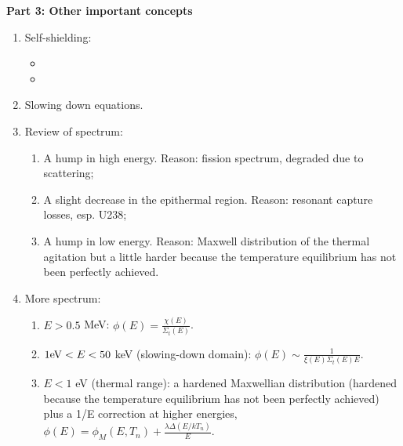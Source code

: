 \documentclass{school-22.211-notes}
\begin{document}
\textbf{Part 3: Other important concepts}
\begin{enumerate}
\item Self-shielding: 
  \begin{itemize}
    \item 
    \item 
  \end{itemize}
\item Slowing down equations. 
\item Review of spectrum:
    \begin{enumerate}
      \item A hump in high energy. Reason: fission spectrum, degraded due to scattering; 
      \item A slight decrease in the epithermal region. Reason: resonant capture losses, esp. U238; 
      \item A hump in low energy. Reason: Maxwell distribution of the thermal agitation but a little harder because the temperature equilibrium has not been perfectly achieved. 
    \end{enumerate}
\item More spectrum: 
  \begin{enumerate}
  \item $E > 0.5$ MeV: $\phi(E) = \frac{\chi(E)}{\Sigma_t(E)}$.
  \item $1 \mathrm{eV} < E < 50$ keV (slowing-down domain): $\phi(E) \sim \frac{1}{\xi(E) \Sigma_t(E) E}$. 
  \item $E < 1$ eV (thermal range): a hardened Maxwellian distribution (hardened because the temperature equilibrium has not been perfectly achieved) plus a 1/E correction at higher energies, $\phi(E) = \phi_M (E, T_n) + \frac{ \lambda \Delta (E/kT_n) }{E}$. 
  \end{enumerate}
\end{enumerate}
\end{document}
